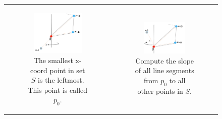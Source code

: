 \documentclass [12pt]{article}
\begin{document}
\begin{enumerate}[label=(\alph*)]
        \begin{figure}[h] 
            \begin{tabular}{cc}
                \begin{subfigure}{0.5\textwidth}
                    \centering
                    \includegraphics[width=0.8\textwidth]{images/star10.PNG}
                    \caption{The smallest x-coord point in set $S$ is the leftmost. This point is called $p_0$.}
                    \label{fig:star10}
                \end{subfigure} &
                \begin{subfigure}{0.5\textwidth}
                    \centering
                    \includegraphics[width=0.7\textwidth]{images/star11.PNG}
                    \caption{Compute the slope of all line segments from $p_0$ to all other points in $S$.}
                    \label{fig:star11}
                \end{subfigure}
            \end{tabular}
            \caption{}
            \label{fig:wrongstar}
        \end{figure}




\end{enumerate}
\end{document}
